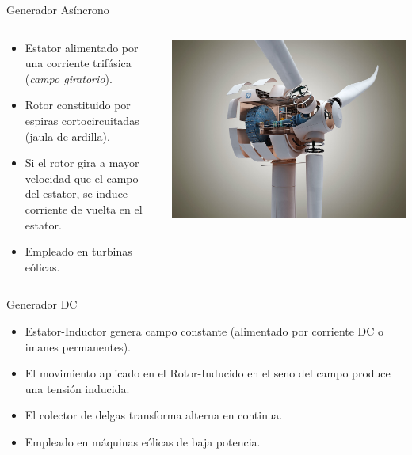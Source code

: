 \documentclass[xcolor={usenames,svgnames,dvipsnames}]{beamer}
\begin{document}
\begin{frame}[label={sec:org1566632}]{Generador Asíncrono}
\begin{columns}
\begin{column}{0.6\columnwidth}
\begin{itemize}
\item \alert{Estator} alimentado por una corriente trifásica (\emph{campo giratorio}).

\item \alert{Rotor} constituido por espiras cortocircuitadas (\alert{jaula de ardilla}).

\item Si el rotor gira a mayor velocidad que el campo del estator, se induce corriente \guillemotleft{}de vuelta\guillemotright{} en el estator.

\item Empleado en turbinas eólicas.
\end{itemize}
\end{column}

\begin{column}{0.5\columnwidth}
\begin{center}
\includegraphics[width=.9\linewidth]{../figs/InsideWindTurbine.jpg}
\end{center}
\end{column}
\end{columns}
\end{frame}

\begin{frame}[label={sec:orgff89faa}]{Generador DC}
\begin{itemize}
\item \alert{Estator-Inductor} genera campo constante (alimentado por corriente DC o imanes permanentes).

\item El movimiento aplicado en el \alert{Rotor-Inducido} en el seno del campo produce una \alert{tensión inducida}.

\item El colector de delgas transforma alterna en continua.

\item Empleado en máquinas eólicas de baja potencia.
\end{itemize}
\end{frame}
\end{document}
